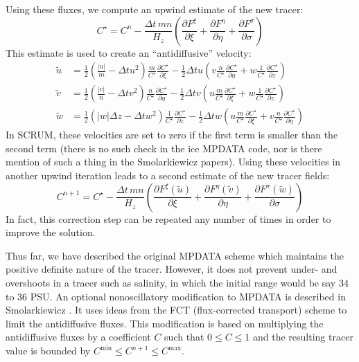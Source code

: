Using these fluxes, we compute an upwind estimate of the new
tracer:
\begin{equation}
   C^{\star} = C^n - \frac{\Delta t\, mn}{H_z} \left(
   \frac{\partial F^\xi}{\partial \xi} +
   \frac{\partial F^\eta}{\partial \eta} +
   \frac{\partial F^\sigma}{\partial \sigma} \right)
\end{equation}
This estimate is used to create an ``antidiffusive'' velocity:
\begin{align}
   \tilde{u} &= \frac{1}{2}
      \left( \frac{|u|}{m} - \Delta t u^2 \right)
      \frac{m}{C^\star} \frac{\partial C^\star}{\partial \xi} -
      \frac{1}{2} \Delta t u \left( v \frac{n}{C^\star} 
      \frac{\partial C^\star}{\partial \eta} +
      w \frac{1}{C^\star} \frac{\partial C^\star}{\partial z}
      \right) \label{antiu} \\
   \tilde{v} &= \frac{1}{2}
      \left( \frac{|v|}{n} - \Delta t v^2 \right)
      \frac{n}{C^\star} \frac{\partial C^\star}{\partial \eta} -
      \frac{1}{2} \Delta t v \left( u \frac{m}{C^\star} 
      \frac{\partial C^\star}{\partial \xi} +
      w \frac{1}{C^\star} \frac{\partial C^\star}{\partial z}
      \right) \label{antiv} \\
   \tilde{w} &= \frac{1}{2}
      \left( |w| \Delta z - \Delta t w^2 \right)
      \frac{1}{C^\star} \frac{\partial C^\star}{\partial z} -
      \frac{1}{2} \Delta t w \left( u \frac{m}{C^\star} 
      \frac{\partial C^\star}{\partial \xi} +
      v \frac{n}{C^\star} \frac{\partial C^\star}{\partial \eta}
      \right) \label{antiw}
\end{align}
In SCRUM, these velocities are set to zero if the first term is smaller
than the second term (there is no such check in the ice MPDATA code,
nor is there mention of such a thing in the Smolarkiewicz papers).
Using these velocities in another upwind iteration leads to a second
estimate of the new tracer fields:
\begin{equation}
   C^{n+1} = C^\star - \frac{\Delta t\, mn}{H_z} \left(
   \frac{\partial F^\xi(\tilde{u})}{\partial \xi} +
   \frac{\partial F^\eta(\tilde{v})}{\partial \eta} +
   \frac{\partial F^\sigma(\tilde{w})}{\partial \sigma} \right)
\label{antidiff}
\end{equation}
In fact, this correction step can be repeated any number of times in
order to improve the solution.

Thus far, we have described the original MPDATA scheme which
maintains the positive definite nature of the tracer.  However, it does
not prevent under- and overshoots in a tracer such as salinity, in which
the initial range would be say 34 to 36 PSU. An optional nonoscillatory
modification to MPDATA is described in Smolarkiewicz \cite{Smolark90}.
It uses ideas from the FCT (flux-corrected transport) scheme to limit
the antidiffusive fluxes. This modification is based on multiplying the
antidiffusive fluxes by a coefficient $C$ such that $0 \leq C \leq 1$
and the resulting tracer value is bounded by $C^{\min} \leq
C^{n+1} \leq C^{\max}$.
  
